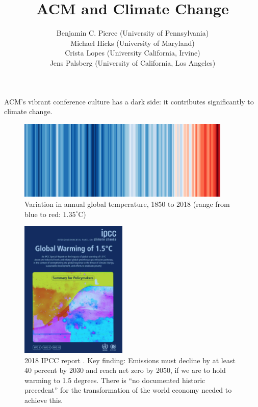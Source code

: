 \documentclass[12pt]{article}
\begin{document}
\title{\Huge ACM and Climate Change}
\author{Benjamin C. Pierce (University of Pennsylvania) \\
Michael Hicks (University of Maryland) \\
Crista Lopes (University California, Irvine) \\
Jens Palsberg (University of California, Los Angeles)}

\maketitle


ACM’s vibrant conference culture has a dark side: it contributes
significantly to climate change.

\begin{figure}[t]
\centering
\includegraphics[width=4in]{wmo_stripes.png}
\caption{Variation in annual global temperature, 1850 to 2018 (range from
  blue to red: $1.35^\circ$C) \cite{WarmingStripes}}
\label{fig:warming}
\end{figure}

\begin{figure}[t]
\centering
\includegraphics[width=2in]{IPCC-cover.png}
\caption{2018 IPCC report \cite{IPCC18}.  Key finding: Emissions must
  decline by at least 40 percent by 2030 and reach net zero by 2050, if we
  are to hold warming to 1.5 degrees.  There is ``no documented historic
  precedent'' for the transformation of the world economy needed to achieve
  this.  }
\label{fig:IPCC-cover}
\end{figure}
\end{document}
